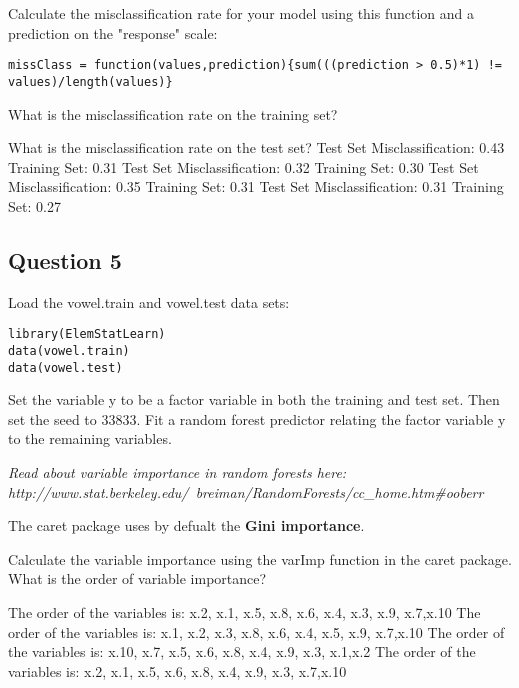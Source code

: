 \noindent Calculate the misclassification rate for your model using this function and a prediction on the "response" scale:
\begin{framed}
	\begin{verbatim}
missClass = function(values,prediction){sum(((prediction > 0.5)*1) != values)/length(values)}
\end{verbatim}
\end{framed}
What is the misclassification rate on the training set? 

What is the misclassification rate on the test set?
Test Set Misclassification: 0.43 
Training Set: 0.31
Test Set Misclassification: 0.32 
Training Set: 0.30
Test Set Misclassification: 0.35 
Training Set: 0.31
Test Set Misclassification: 0.31 
Training Set: 0.27
\subsection*{Question 5}
Load the vowel.train and vowel.test data sets:
\begin{framed}
\begin{verbatim}
library(ElemStatLearn)
data(vowel.train)
data(vowel.test) 
\end{verbatim}
\end{framed}
Set the variable y to be a factor variable in both the training and test set. Then set the seed to 33833. Fit a random forest predictor relating the factor variable y to the remaining variables. 

\textit{Read about variable importance in random forests here: http://www.stat.berkeley.edu/~breiman/RandomForests/cc\_home.htm\#ooberr} 

The caret package uses by defualt the \textbf{Gini importance}. 

Calculate the variable importance using the varImp function in the caret package. What is the order of variable importance?

The order of the variables is:
x.2, x.1, x.5, x.8, x.6, x.4, x.3, x.9, x.7,x.10
 The order of the variables is:
x.1, x.2, x.3, x.8, x.6, x.4, x.5, x.9, x.7,x.10
 The order of the variables is:
x.10, x.7, x.5, x.6, x.8, x.4, x.9, x.3, x.1,x.2
 The order of the variables is:
x.2, x.1, x.5, x.6, x.8, x.4, x.9, x.3, x.7,x.10

